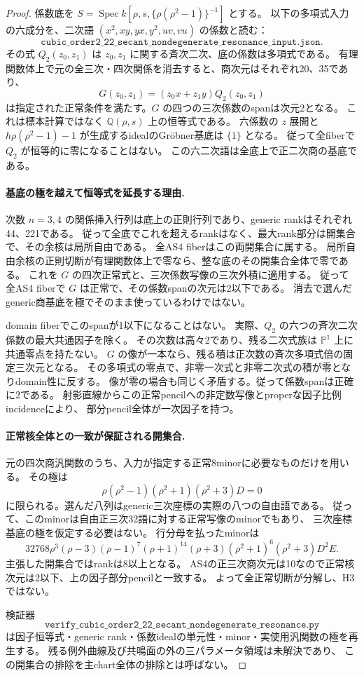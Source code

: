 \begin{proof}
係数底を $S=\operatorname{Spec}k[\rho,s,\{\rho(\rho^2-1)\}^{-1}]$ とする。
以下の多項式入力の六成分を、二次語 $(x^2,xy,yx,y^2,uv,vu)$ の係数と読む：
\[
 \texttt{cubic\_order2\_22\_secant\_nondegenerate\_resonance\_input.json}.
\]
その式 $Q_2(z_0,z_1)$ は $z_0,z_1$ に関する斉次二次、底の係数は多項式である。
有理関数体上で元の全三次・四次関係を消去すると、商次元はそれぞれ20、35であり、
\[
 G(z_0,z_1)=(z_0x+z_1y)Q_2(z_0,z_1)
\]
は指定された正常条件を満たす。$G$ の四つの三次係数のspanは次元2となる。
これは標本計算ではなく $\mathbb Q(\rho,s)$ 上の恒等式である。
六係数の $z$ 展開と $h\rho(\rho^2-1)-1$ が生成するidealのGr\"obner基底は $\{1\}$ となる。
従って全fiberで $Q_2$ が恒等的に零になることはない。
この六二次語は全底上で正二次商の基底である。

\paragraph{基底の極を越えて恒等式を延長する理由.}
次数 $n=3,4$ の関係挿入行列は底上の正則行列であり、generic rankはそれぞれ44、221である。
従って全底でこれを超えるrankはなく、最大rank部分は開集合で、その余核は局所自由である。
全AS4 fiberはこの両開集合に属する。
局所自由余核の正則切断が有理関数体上で零なら、整な底のその開集合全体で零である。
これを $G$ の四次正常式と、三次係数写像の三次外積に適用する。
従って全AS4 fiberで $G$ は正常で、その係数spanの次元は2以下である。
消去で選んだgeneric商基底を極でそのまま使っているわけではない。

domain fiberでこのspanが1以下になることはない。
実際、$Q_2$ の六つの斉次二次係数の最大共通因子を除く。
その次数は高々2であり、残る二次式族は $\mathbb P^1$ 上に共通零点を持たない。
$G$ の像が一本なら、残る積は正次数の斉次多項式倍の固定三次元となる。
その多項式の零点で、非零一次式と非零二次式の積が零となりdomain性に反する。
像が零の場合も同じく矛盾する。従って係数spanは正確に2である。
射影直線からこの正常pencilへの非定数写像とproperな因子比例incidenceにより、
部分pencil全体が一次因子を持つ。

\paragraph{正常核全体との一致が保証される開集合.}
元の四次商汎関数のうち、入力が指定する正常8minorに必要なものだけを用いる。
その極は
\[
 \rho(\rho^2-1)(\rho^2+1)(\rho^2+3)D=0
\]
に限られる。選んだ八列はgeneric三次座標の実際の八つの自由語である。
従って、このminorは自由正三次32語に対する正常写像のminorでもあり、
三次座標基底の極を仮定する必要はない。
行分母を払ったminorは
\[
 32768\rho^3(\rho-3)(\rho-1)^7(\rho+1)^{14}(\rho+3)
 (\rho^2+1)^6(\rho^2+3)D^2E.
\]
主張した開集合ではrankは8以上となる。
AS4の正三次商次元は10なので正常核次元は2以下、上の因子部分pencilと一致する。
よって全正常切断が分解し、H3ではない。

検証器
\[
 \texttt{verify\_cubic\_order2\_22\_secant\_nondegenerate\_resonance.py}
\]
は因子恒等式・generic rank・係数idealの単元性・minor・実使用汎関数の極を再生する。
残る例外曲線及び共鳴面の外の三パラメータ領域は未解決であり、
この開集合の排除を主chart全体の排除とは呼ばない。
\end{proof}
